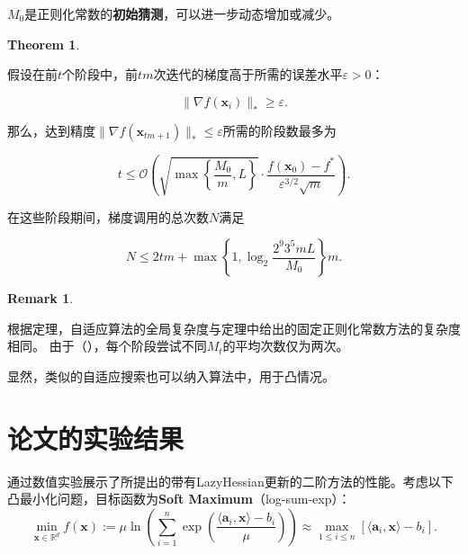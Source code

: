 \documentclass[a4paper,twoside,AutoFakeBold]{article}
\theoremstyle{definition}
\newtheorem{thrm2}{{Theorem}}[section]
\newtheorem{remark2}{{Remark}}
\begin{document}
\(M_0\)是正则化常数的\textbf{初始猜测}，可以进一步动态增加或减少。

\begin{mdframed}
\begin{thrm2}\label{thrm:6.1}

假设在前\(t\)个阶段中，前\(tm\)次迭代的梯度高于所需的误差水平\(\varepsilon > 0\)：

\begin{equation}\label{27}
\|\nabla f(\mathbf{x}_i)\|_* \geq \varepsilon. \tag{27}
\end{equation}

那么，达到精度\(\|\nabla f(\mathbf{x}_{tm + 1})\|_* \leq \varepsilon\)所需的阶段数最多为

\begin{equation}\label{28}
t \leq \mathcal{O}\left( \sqrt{\max \left\{ \frac{M_0}{m}, L \right\}} \cdot \frac{f(\mathbf{x}_0) - f^*}{\varepsilon^{3/2} \sqrt{m}} \right). \tag{28}
\end{equation}

在这些阶段期间，梯度调用的总次数\(N\)满足

\begin{equation}\label{29}
N \leq 2tm + \max \left\{ 1, \log_2 \frac{2^9 3^5 m L}{M_0} \right\} m. \tag{29}
\end{equation}
\end{thrm2}
\end{mdframed}

\begin{remark2}\label{remark:6.2}
	
根据定理，自适应算法的全局复杂度与定理中给出的固定正则化常数方法的复杂度相同。
由于（），每个阶段尝试不同\(M_t\)的平均次数仅为两次。

\end{remark2}
显然，类似的自适应搜索也可以纳入算法中，用于凸情况。
\newpage



%

\section{论文的实验结果}
通过数值实验展示了所提出的带有LazyHessian更新的二阶方法的性能。考虑以下凸最小化问题，目标函数为\textbf{Soft Maximum}（log-sum-exp）：
\[
\min_{\mathbf{x} \in \mathbb{R}^{d}} f(\mathbf{x}) := \mu \ln \left( \sum_{i=1}^{n} \exp \left( \frac{\langle \mathbf{a}_{i}, \mathbf{x} \rangle - b_{i}}{\mu} \right) \right) \approx \max_{1 \leq i \leq n} \left[ \langle \mathbf{a}_{i}, \mathbf{x} \rangle - b_{i} \right].
\]
\end{document}
